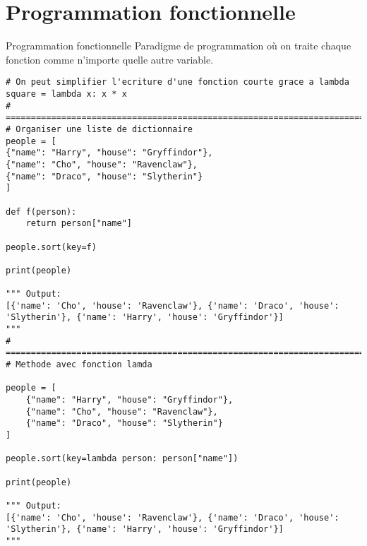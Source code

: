 \documentclass{report}
\begin{document}
\section{Programmation fonctionnelle}
\begin{DefG*}{Programmation fonctionnelle}{}
Paradigme de programmation où on traite chaque fonction comme n'importe quelle autre variable.
\end{DefG*}
\begin{EExample*}{}{}
\begin{lstlisting}[style=PythonDraculaWhite]
# On peut simplifier l'ecriture d'une fonction courte grace a lambda
square = lambda x: x * x
# =================================================================================
# Organiser une liste de dictionnaire
people = [
{"name": "Harry", "house": "Gryffindor"},
{"name": "Cho", "house": "Ravenclaw"},
{"name": "Draco", "house": "Slytherin"}
]

def f(person):
    return person["name"]

people.sort(key=f)

print(people)

""" Output:
[{'name': 'Cho', 'house': 'Ravenclaw'}, {'name': 'Draco', 'house': 'Slytherin'}, {'name': 'Harry', 'house': 'Gryffindor'}]
"""
# =================================================================================
# Methode avec fonction lamda

people = [
    {"name": "Harry", "house": "Gryffindor"},
    {"name": "Cho", "house": "Ravenclaw"},
    {"name": "Draco", "house": "Slytherin"}
]

people.sort(key=lambda person: person["name"])

print(people)

""" Output:
[{'name': 'Cho', 'house': 'Ravenclaw'}, {'name': 'Draco', 'house': 'Slytherin'}, {'name': 'Harry', 'house': 'Gryffindor'}]
"""
\end{lstlisting}
\end{EExample*}
% 
\end{document}
